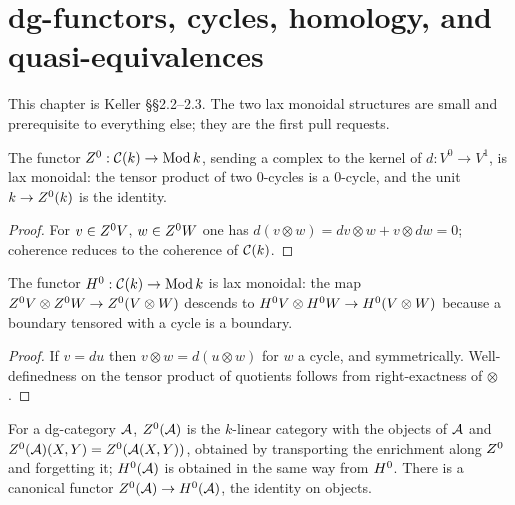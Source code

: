 \chapter{dg-functors, cycles, homology, and quasi-equivalences}
\label{ch:functors}

This chapter is Keller \S\S 2.2--2.3. The two lax monoidal structures are small and
prerequisite to everything else; they are the first pull requests.

\begin{lemma}
\label{lem:Z0-lax-monoidal}
The functor $Z^0 : \mathcal{C}(k) \to \operatorname{Mod} k$, sending a complex to the kernel of
$d : V^0 \to V^1$, is lax monoidal: the tensor product of two $0$-cycles is a $0$-cycle,
and the unit $k \to Z^0(k)$ is the identity.
\end{lemma}
\begin{proof}
For $v \in Z^0 V$, $w \in Z^0 W$ one has $d(v \otimes w) = dv \otimes w + v \otimes dw = 0$;
coherence reduces to the coherence of $\mathcal{C}(k)$.
\end{proof}

\begin{lemma}
\label{lem:H0-lax-monoidal}
The functor $H^0 : \mathcal{C}(k) \to \operatorname{Mod} k$ is lax monoidal: the map
$Z^0 V \otimes Z^0 W \to Z^0(V \otimes W)$ descends to
$H^0 V \otimes H^0 W \to H^0(V \otimes W)$ because a boundary tensored with a cycle is a
boundary.
\end{lemma}
\begin{proof}
If $v = du$ then $v \otimes w = d(u \otimes w)$ for $w$ a cycle, and symmetrically.
Well-definedness on the tensor product of quotients follows from right-exactness of
$\otimes$.
\end{proof}

\begin{definition}
\label{def:Z0-H0}
For a dg-category $\mathcal{A}$, $Z^0(\mathcal{A})$ is the $k$-linear category with the objects of $\mathcal{A}$
and $Z^0(\mathcal{A})(X,Y) = Z^0(\mathcal{A}(X,Y))$, obtained by transporting the enrichment along $Z^0$
and forgetting it; $H^0(\mathcal{A})$ is obtained in the same way from $H^0$. There is a canonical
functor $Z^0(\mathcal{A}) \to H^0(\mathcal{A})$, the identity on objects.
\end{definition}

